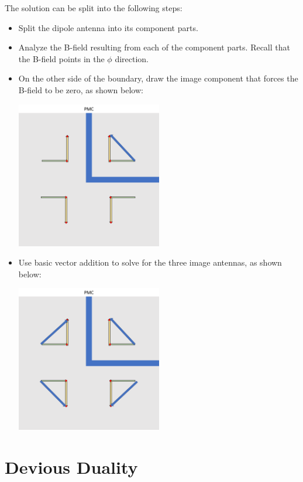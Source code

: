 \documentclass{article}
\begin{document}
The solution can be split into the following steps:

\begin{itemize}
    \item Split the dipole antenna into its component parts.
    \item Analyze the B-field resulting from each of the component parts. Recall that the B-field points in the $\phi$ direction.
    \item On the other side of the boundary, draw the image component that forces the B-field to be zero, as shown below:
    \begin{center}
    \includegraphics[width=0.5\textwidth]{figures/PMC Solution Initial.jpg}
    \end{center}
    \item Use basic vector addition to solve for the three image antennas, as shown below:
    \begin{center}
    \includegraphics[width=0.5\textwidth]{figures/PMC Solution Final.jpg}
    \end{center}
\end{itemize}

\newpage

\section{Devious Duality}
\end{document}
